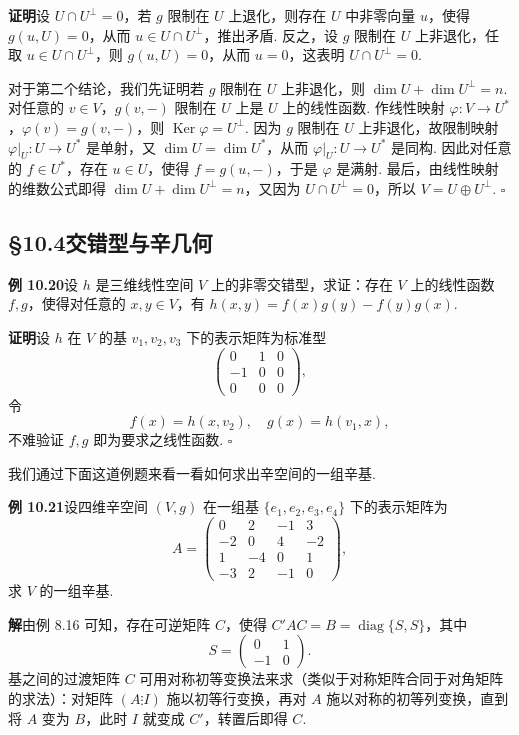\documentclass[UTF8, 12pt, fontset=fandol, oneside]{ctexart}
\begin{document}
\noindent\textbf{证明}\quad 设 $U\cap U^\perp=0$，若 $g$ 限制在 $U$ 上退化，则存在 $U$ 中非零向量 $u$，使得 $g(u,U)=0$，从而 $u\in U\cap U^\perp$，推出矛盾. 反之，设 $g$ 限制在 $U$ 上非退化，任取 $u\in U\cap U^\perp$，则 $g(u,U)=0$，从而 $u=0$，这表明 $U\cap U^\perp=0$.

对于第二个结论，我们先证明若 $g$ 限制在 $U$ 上非退化，则 $\dim U+\dim U^\perp=n$. 对任意的 $v\in V$，$g(v,-)$ 限制在 $U$ 上是 $U$ 上的线性函数. 作线性映射 $\varphi:V\to U^*$，$\varphi(v)=g(v,-)$，则 $\operatorname{Ker}\varphi=U^\perp$. 因为 $g$ 限制在 $U$ 上非退化，故限制映射 $\varphi|_U:U\to U^*$ 是单射，又 $\dim U=\dim U^*$，从而 $\varphi|_U:U\to U^*$ 是同构. 因此对任意的 $f\in U^*$，存在 $u\in U$，使得 $f=g(u,-)$，于是 $\varphi$ 是满射. 最后，由线性映射的维数公式即得 $\dim U+\dim U^\perp=n$，又因为 $U\cap U^\perp=0$，所以 $V=U\oplus U^\perp$. $\square$

\subsection*{§10.4\quad 交错型与辛几何}

\noindent\textbf{例 10.20}\quad 设 $h$ 是三维线性空间 $V$ 上的非零交错型，求证：存在 $V$ 上的线性函数 $f,g$，使得对任意的 $x,y\in V$，有 $h(x,y)=f(x)g(y)-f(y)g(x)$.

\noindent\textbf{证明}\quad 设 $h$ 在 $V$ 的基 $v_1,v_2,v_3$ 下的表示矩阵为标准型
\[
\left(\begin{array}{ccc}
0 & 1 & 0\\
-1 & 0 & 0\\
0 & 0 & 0
\end{array}\right),
\]
令
\[
f(x)=h(x,v_2),\quad g(x)=h(v_1,x),
\]
不难验证 $f,g$ 即为要求之线性函数. $\square$

我们通过下面这道例题来看一看如何求出辛空间的一组辛基.

\noindent\textbf{例 10.21}\quad 设四维辛空间 $(V,g)$ 在一组基 $\{e_1,e_2,e_3,e_4\}$ 下的表示矩阵为
\[
A=\left(\begin{array}{rrrr}
0 & 2 & -1 & 3\\
-2 & 0 & 4 & -2\\
1 & -4 & 0 & 1\\
-3 & 2 & -1 & 0
\end{array}\right),
\]
求 $V$ 的一组辛基.

\noindent\textbf{解}\quad 由例 8.16 可知，存在可逆矩阵 $C$，使得 $C'AC=B=\operatorname{diag}\{S,S\}$，其中
\[
S=\left(\begin{array}{cc}
0 & 1\\
-1 & 0
\end{array}\right).
\]
基之间的过渡矩阵 $C$ 可用对称初等变换法来求（类似于对称矩阵合同于对角矩阵的求法）：对矩阵 $(A\vdots I)$ 施以初等行变换，再对 $A$ 施以对称的初等列变换，直到将 $A$ 变为 $B$，此时 $I$ 就变成 $C'$，转置后即得 $C$.
\end{document}
